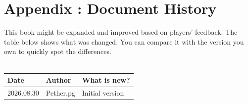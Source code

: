 \onecolumn
\chapter{Appendix \thechapter{}: Document History}

This book might be expanded and improved based on players' feedback. The table below shows what was changed. You can compare it with the version you own to quickly spot the differences. \\ \\

\begin{tabular}{p{2cm} p{2cm} p{10cm}}
	Date & Author & What is new? \\ \hline	
	
	\color{black} 2026.08.30
	& \color{black} Pether.pg
	& \color{black}   Initial version \\	
	\hline	
	
\end{tabular}

\twocolumn

